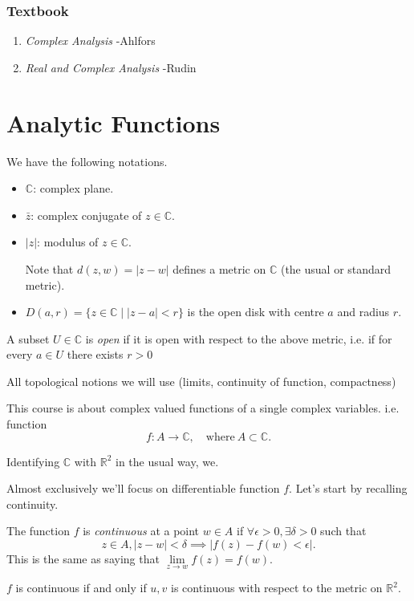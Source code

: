 \subsubsection*{Textbook}
\begin{enumerate}
    \item \textit{Complex Analysis} -Ahlfors
    \item \textit{Real and Complex Analysis} -Rudin
\end{enumerate}
\section{Analytic Functions}
\begin{notation}
    We have the following notations.
    \begin{itemize}
        \item \(\mathbb{C}\): complex plane.
        \item \(\bar{z}\): complex conjugate of \(z \in \mathbb{C}\).
        \item \(\left\vert z \right\vert \): modulus of \(z \in \mathbb{C}\).

        Note that \(d(z, w) = \left\vert z - w \right\vert \) defines a metric on \(\mathbb{C}\) (the usual or standard metric).
        \item \(D(a, r) = \{z\in \mathbb{C}\mid \left\vert z - a \right\vert <r\}\) is the open disk with centre \(a\) and radius \(r\).
    \end{itemize}
\end{notation}
\begin{definition}
    A subset \(U \in \mathbb{C}\) is \textit{open} if it is open with respect to the above metric, i.e. if for every \(a \in U\) there exists \(r > 0\) 
\end{definition}
All topological notions we will use (limits, continuity of function, compactness)

This course is about complex valued functions of a single complex variables. i.e. function
\[
    f:A\to \mathbb{C},\quad \text{where}~ A\subset \mathbb{C}.
\]
\begin{remark}
    Identifying \(\mathbb{C}\) with \(\mathbb{R}^2\) in the usual way, we.
\end{remark}

Almost exclusively we'll focus on differentiable function \(f\). Let's start by recalling continuity.

\begin{definition}
    The function \(f\) is \textit{continuous} at a point \(w \in A\) if \(\forall \epsilon > 0, \exists \delta > 0\) such that
    \[
        z \in A, \left\vert z - w \right\vert <\delta \implies \left\vert f(z)-f(w) < \epsilon \right\vert.
    \]
    This is the same as saying that \(\lim\limits_{z \to w} f(z)=f(w)\).
\end{definition}
\begin{remark}
    \(f\) is continuous if and only if \(u,v\) is continuous with respect to the metric on \(\mathbb{R}^2\).
\end{remark}

